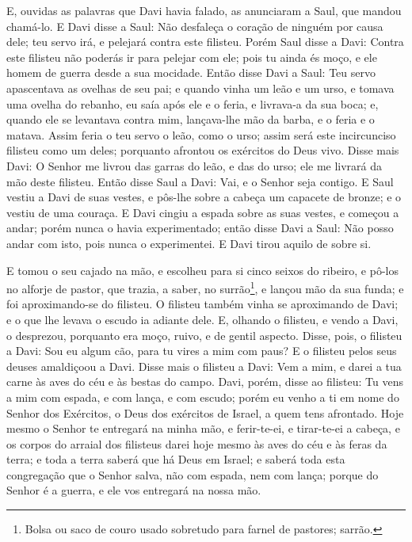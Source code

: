 E, ouvidas as palavras que Davi havia falado, as anunciaram a
Saul, que mandou chamá-lo. E Davi disse a Saul: Não desfaleça
o coração de ninguém por causa dele; teu servo irá, e pelejará
contra este filisteu. Porém Saul disse a Davi: Contra este
filisteu não poderás ir para pelejar com ele; pois tu ainda és moço,
e ele homem de guerra desde a sua mocidade. Então disse Davi
a Saul: Teu servo apascentava as ovelhas de seu pai; e quando vinha
um leão e um urso, e tomava uma ovelha do rebanho, eu saía
após ele e o feria, e livrava-a da sua boca; e, quando ele se
levantava contra mim, lançava-lhe mão da barba, e o feria e o
matava. Assim feria o teu servo o leão, como o urso; assim
será este incircunciso filisteu como um deles; porquanto afrontou os
exércitos do Deus vivo. Disse mais Davi: O Senhor me livrou
das garras do leão, e das do urso; ele me livrará da mão deste
filisteu. Então disse Saul a Davi: Vai, e o Senhor seja contigo.
E Saul vestiu a Davi de suas vestes, e pôs-lhe sobre a cabeça
um capacete de bronze; e o vestiu de uma couraça. E Davi
cingiu a espada sobre as suas vestes, e começou a andar; porém nunca
o havia experimentado; então disse Davi a Saul: Não posso andar com
isto, pois nunca o experimentei. E Davi tirou aquilo de sobre si.

E tomou o seu cajado na mão, e escolheu para si cinco seixos do
ribeiro, e pô-los no alforje de pastor, que trazia, a saber, no
surrão\footnote{Bolsa ou saco de couro usado sobretudo para farnel
de pastores; sarrão.}, e lançou mão da sua funda; e foi
aproximando-se do filisteu. O filisteu também vinha se
aproximando de Davi; e o que lhe levava o escudo ia adiante dele.
E, olhando o filisteu, e vendo a Davi, o desprezou, porquanto
era moço, ruivo, e de gentil aspecto. Disse, pois, o filisteu
a Davi: Sou eu algum cão, para tu vires a mim com paus? E o filisteu
pelos seus deuses amaldiçoou a Davi. Disse mais o filisteu a
Davi: Vem a mim, e darei a tua carne às aves do céu e às bestas do
campo. Davi, porém, disse ao filisteu: Tu vens a mim com
espada, e com lança, e com escudo; porém eu venho a ti em nome do
Senhor dos Exércitos, o Deus dos exércitos de Israel, a quem tens
afrontado. Hoje mesmo o Senhor te entregará na minha mão, e
ferir-te-ei, e tirar-te-ei a cabeça, e os corpos do arraial dos
filisteus darei hoje mesmo às aves do céu e às feras da terra; e
toda a terra saberá que há Deus em Israel; e saberá toda esta
congregação que o Senhor salva, não com espada, nem com lança;
porque do Senhor é a guerra, e ele vos entregará na nossa mão.

